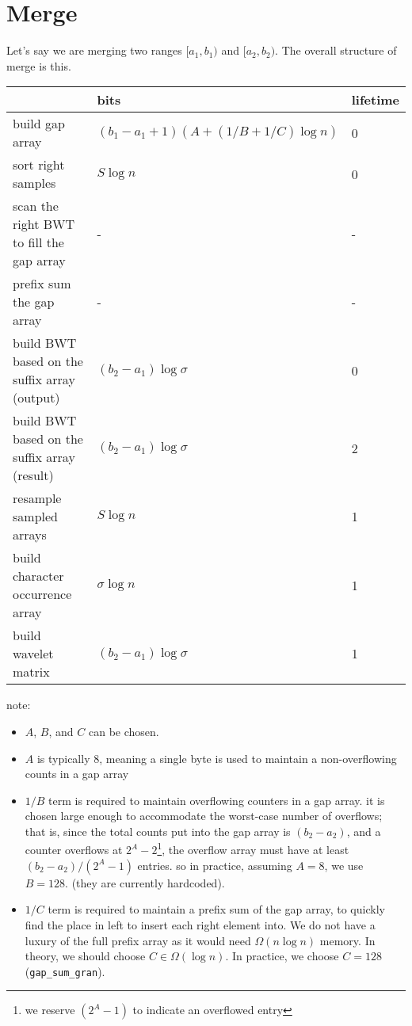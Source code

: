 \documentclass[12pt,dvipdfmx]{article}
\begin{document}
\section{Merge}
Let's say we are merging two ranges $[a_1, b_1)$ and $[a_2, b_2)$.
The overall structure of merge is this.

\begin{center}
\begin{tabular}{|p{8cm}|l|l|}\hline
 & bits & lifetime \\\hline
build gap array          & $(b_1 - a_1 + 1) (A + (1/B + 1/C) \log n)$ & 0 \\
sort right samples       & $S \log n$                         & 0 \\
scan the right BWT to fill the gap array & -                      & - \\
prefix sum the gap array & -                                      & - \\
build BWT based on the suffix array (output) & $(b_2 - a_1) \log \sigma$ & 0 \\
build BWT based on the suffix array (result) & $(b_2 - a_1) \log \sigma$ & 2 \\
resample sampled arrays  & $S \log n$                             & 1 \\
build character occurrence array & $\sigma \log n$              & 1 \\
build wavelet matrix     & $(b_2 - a_1) \log \sigma$             & 1 \\\hline
\end{tabular}
\end{center}

note:
\begin{itemize}
\item $A$, $B$, and $C$ can be chosen.
\item $A$ is typically 8, meaning a single byte is used to 
maintain a non-overflowing counts in a gap array
\item $1/B$ term is required to maintain
  overflowing counters in a gap array. it is
  chosen large enough to accommodate the
  worst-case number of overflows; that is,
  since the total counts put into the gap
  array is $(b_2 - a_2)$, and a counter
  overflows at $2^A - 2$\footnote{we reserve
    $(2^A - 1)$ to indicate an overflowed
    entry}, the overflow array must have at
  least $(b_2 - a_2) / (2^A - 1)$ entries.
  so in practice, assuming $A = 8$, we use $B = 128$.
  (they are currently hardcoded).

\item $1/C$ term is required to maintain a
  prefix sum of the gap array, to quickly
  find the place in left to insert each right
  element into.  We do not have a luxury of
  the full prefix array as it would need
  $\Omega (n \log n)$ memory.  In theory,
  we should choose $C \in \Omega (\log n)$.
  In practice, we choose $C = 128$
  ({\tt gap\_sum\_gran}).

\end{itemize}
\end{document}
